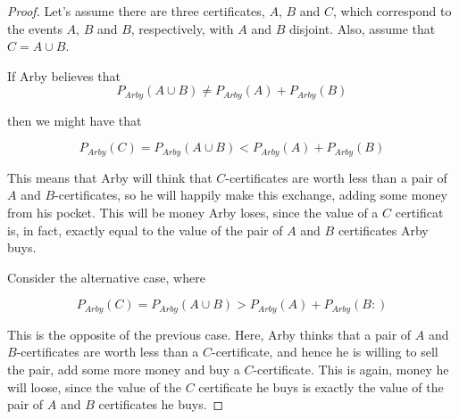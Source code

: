 \begin{proof}
    Let's assume there are three certificates, $A$, $B$ and $C$, which correspond to the events $A$, $B$ and $B$, respectively, with $A$ and $B$ disjoint. Also, assume that $C = A \cup B$.

    If Arby believes that 
    $$P_{Arby}(A \cup B) \neq P_{Arby}(A) + P_{Arby}(B)$$

    then we might have that

    $$P_{Arby}(C) = P_{Arby}(A \cup B) < P_{Arby}(A) + P_{Arby}(B)$$

    This means that Arby will think that $C$-certificates are worth less than a pair of $A$ and $B$-certificates, so he will happily make this exchange, adding some money from his pocket. This will be money Arby loses, since the value of a $C$ certificat is, in fact, exactly equal to the value of the pair of $A$ and $B$ certificates Arby buys.

    \vspace{1em}

    Consider the alternative case, where 
    
     $$P_{Arby}(C) = P_{Arby}(A \cup B) > P_{Arby}(A) + P_{Arby}(B:)$$

    This is the opposite of the previous case. Here, Arby thinks that a pair of $A$ and $B$-certificates are worth less than a $C$-certificate, and hence he is willing to sell the pair, add some more money and buy a $C$-certificate. This is again, money he will loose, since the value of the $C$ certificate he buys is exactly the value of the pair of $A$ and $B$ certificates he buys.
\end{proof}


